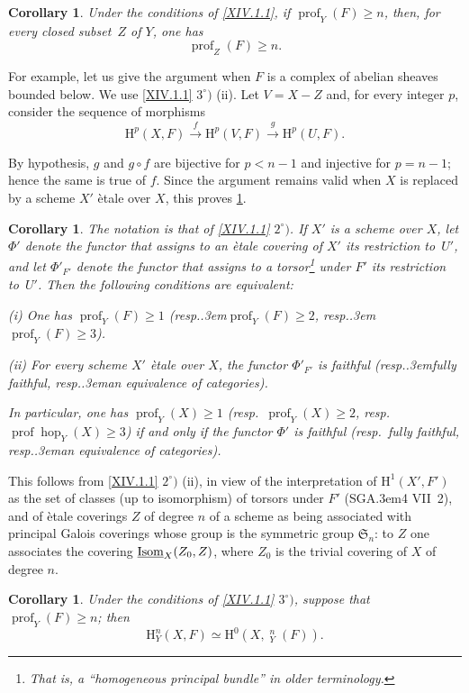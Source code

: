 \documentclass[11pt,a4paper,oneside]{book}
\providecommand{\pageoriginale}{%
  \refstepcounter{pageoriginal}%
  \marginpar{\raggedright\footnotesize\bfseries\thepageoriginal}%
  \xspace}
\providecommand{\sfootnote}[1]{\footnote{#1}}
\providecommand{\og}{``}
\providecommand{\fg}{''\xspace}
\providecommand{\resp}{resp.\kern.3em}
\providecommand{\SGA}{\textup{SGA}\kern.3em}
\DeclareMathOperator{\hop}{hop}
\providecommand{\h}{\mathop{\underline{H}}\nolimits}
\providecommand{\prof}{\operatorname{prof}}
\renewcommand{\H}{\mathrm H}
\providecommand{\lto}[1]{\xrightarrow{#1}}
\providecommand{\Isom}{\textup{Isom}}
\theoremstyle{plain}
\newtheorem{corollaire}[subsection]{Corollary}
\theoremstyle{definition}
\theoremstyle{remark}
\renewcommand{\Ref}[1]{\textup{\ref{#1}}}
\begin{document}
\begin{corollaire} \label{XIV.1.3}
Under the conditions of \Ref{XIV.1.1}, if $\prof_Y(F)\geq n$, then, for every closed subset~$Z$ of $Y$, one has
$$
\prof_Z(F)\geq n.
$$
\end{corollaire}

For example, let us give the argument when $F$ is a complex of abelian sheaves bounded below. We use \Ref{XIV.1.1} $3^\circ)$ \textup{(ii)}. Let $V=X-Z$ and, for every integer $p$, consider the sequence of morphisms
$$
\H^p(X, F)\lto{f} \H^p(V, F)\lto{g} \H^p(U, F).
$$

By hypothesis, $g$ and $g\circ f$ are bijective for $p<n-1$ and injective for $p=n-1$; hence the same is true of $f$. Since the argument remains valid when $X$ is replaced by a scheme $X'$ \`etale over $X$, this proves \Ref{XIV.1.3}.

\begin{corollaire} \label{XIV.1.4} The notation is that of \Ref{XIV.1.1} $2^\circ)$. If $X'$ is a scheme over\pageoriginale $X$, let $\Phi'$ denote the functor that assigns to an \`etale covering of $X'$ its restriction to~$U'$, and let $\Phi'_{F'}$ denote the functor that assigns to a torsor\sfootnote{That is, a \og homogeneous principal bundle\fg in older terminology.} under $F'$ its restriction to~$U'$. Then the following conditions are equivalent:

\textup{(i)} One has $\prof_Y(F)\geq 1$ (\resp $\prof_Y(F)\geq 2$, \resp $\prof_Y(F)\geq 3$).

\textup{(ii)} For every scheme $X'$ \`etale over $X$, the functor $\Phi'_{F'}$ is faithful (\resp fully faithful, \resp an equivalence of categories).

In particular, one has $\prof_Y({X})\geq 1$ (resp.\ $\prof_Y({X})\geq 2$, resp.\ $\prof \hop_Y(X)\geq 3$) if and only if the functor $\Phi'$ is faithful (resp.\ fully faithful, \resp an equivalence of categories).
\end{corollaire}

This follows from \Ref{XIV.1.1} $2^\circ)$ \textup{(ii)}, in view of the interpretation of $\H^1(X', F')$ as the set of classes (up to isomorphism) of torsors under $F'$ (\SGA 4 VII~2), and of \`etale coverings $Z$ of degree $n$ of a scheme as being associated with principal Galois coverings whose group is the symmetric group $\mathfrak{S}_n$: to $Z$ one associates the covering $\underline{\Isom}_X(Z_0, Z)$, where $Z_0$ is the trivial covering of $X$ of degree $n$.

\begin{corollaire} \label{XIV.1.5} Under the conditions of \Ref{XIV.1.1} $3^\circ)$, suppose that $\prof_Y(F)\geq n$; then
$$
\H_Y^n(X, F)\simeq \H^0(X, {\h}_Y^n(F)).
$$
\end{corollaire}
\end{document}
